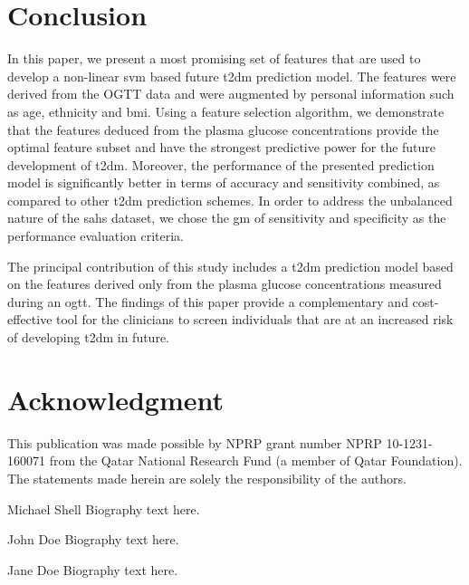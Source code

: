 \documentclass[journal,comsoc]{IEEEtran}
\renewcommand{\^}{\hat}  %
\begin{document}
\section{Conclusion}
%
%
In this paper, we present a most promising set of features that are used to develop a non-linear \ac{svm} based future \ac{t2dm} prediction model. The features were derived from the OGTT data and were augmented by personal information such as age, ethnicity and \ac{bmi}. Using a feature selection algorithm, we demonstrate that the features deduced from the plasma glucose concentrations provide the optimal feature subset and have the strongest predictive power for the future development of \ac{t2dm}. Moreover, the performance of the presented prediction model is significantly better in terms of accuracy and sensitivity combined, as compared to other \ac{t2dm} prediction schemes. In order to address the unbalanced nature of the \ac{sahs} dataset, we chose the \ac{gm} of sensitivity and specificity as the performance evaluation criteria.

The principal contribution of this study includes a \ac{t2dm} prediction model based on the features derived only from the plasma glucose concentrations measured during an \ac{ogtt}. The findings of this paper provide a complementary and cost-effective tool for the clinicians to screen individuals that are at an increased risk of developing \ac{t2dm} in future.

%
%
%
%
\section*{Acknowledgment}
%
This publication was made possible by NPRP grant number NPRP 10-1231-160071 from the Qatar National Research Fund (a member of Qatar Foundation). The statements made herein are solely the responsibility of the authors.
%
%
\ifCLASSOPTIONcaptionsoff
\newpage
\fi

% 

%
%
\begin{IEEEbiography}{Michael Shell}
  Biography text here.
\end{IEEEbiography}
%
\begin{IEEEbiographynophoto}{John Doe}
  Biography text here.
\end{IEEEbiographynophoto}
%
%
\begin{IEEEbiographynophoto}{Jane Doe}
  Biography text here.
\end{IEEEbiographynophoto}
%





\end{document}

